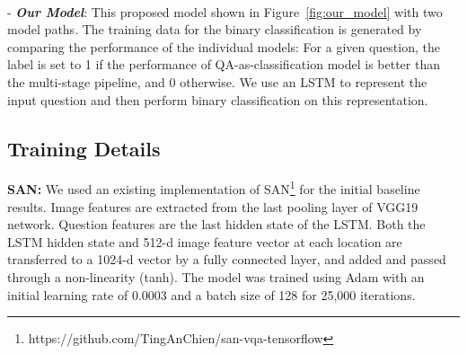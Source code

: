\documentclass[10pt,twocolumn,letterpaper]{article}
\begin{document}
\\
\noindent - \textit{\textbf{Our Model}}:  This proposed model shown in Figure~\ref{fig:our_model} with two model paths.
The training data for the binary classification is generated by comparing the performance of the individual models: For a given question, the label is set to 1 if the performance of QA-as-classification model is better than the multi-stage pipeline, and 0 otherwise. 
       We use an LSTM to represent the input question and then perform binary classification on this representation.









\subsection{Training Details}





\noindent\textbf{SAN:} We used an existing implementation of SAN\footnote{https://github.com/TingAnChien/san-vqa-tensorflow} for the initial baseline results. Image features are extracted from the last pooling layer of VGG19 network. Question features are the last hidden state of the LSTM. Both the LSTM hidden state and 512-d image feature vector at each location are transferred to a 1024-d vector by a fully connected layer, and added and passed through a non-linearity (tanh). The model was trained using Adam \cite{Adam} with an initial learning rate of $0.0003$ and a batch size of 128 for 25,000 iterations.
\end{document}
